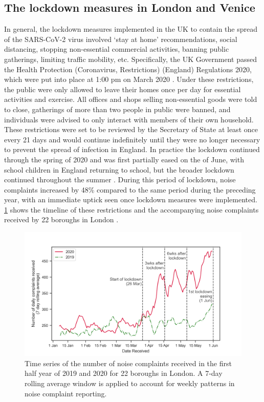  \subsection{The lockdown measures in London and Venice}

In general, the lockdown measures implemented in the UK to contain the spread of the SARS-CoV-2 virus involved `stay at home' recommendations, social distancing, stopping non-essential commercial activities, banning public gatherings, limiting traffic mobility, etc. Specifically, the UK Government passed the Health Protection (Coronavirus, Restrictions) (England) Regulations 2020, which were put into place at 1:00 pm on  March 2020 \citep{PHE2020Health}. Under these restrictions, the public were only allowed to leave their homes once per day for essential activities and exercise. All offices and shops selling non-essential goods were told to close, gatherings of more than two people in public were banned, and individuals were advised to only interact with members of their own household. These restrictions were set to be reviewed by the Secretary of State at least once every 21 days and would continue indefinitely until they were no longer necessary to prevent the spread of infection in England. In practice the lockdown continued through the spring of 2020 and was first partially eased on the  of June, with school children in England returning to school, but the broader lockdown continued throughout the summer \citep{Tong2021Increases}. During this period of lockdown, noise complaints increased by 48\% compared to the same period during the preceding year, with an immediate uptick seen once lockdown measures were implemented. \cref{fig:noiseComplaints} shows the timeline of these restrictions and the accompanying noise complaints received by 22 boroughs in London \citep{Tong2021Increases}.

\begin{figure}[h]
  \centering
  \includegraphics[width=\textwidth]{Figures/LockdownNoiseComplaints-TimeSeriesPlot_3.png}
  \caption[Time series of the number of noise complaints received in the first half year of 2019 and 2020. A 7-day rolling average window is applied to account for weekly patterns in noise complaint reporting.]{Time series of the number of noise complaints received in the first half year of 2019 and 2020 for 22 boroughs in London. A 7-day rolling average window is applied to account for weekly patterns in noise complaint reporting\footnotemark. \label{fig:noiseComplaints}}
\end{figure}

